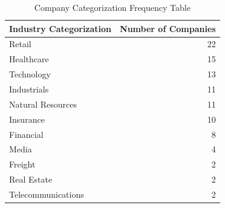 \documentclass[a4paper]{article}
\begin{document}
    \begin{table}[h]
        \begin{tabular}{| l | r |}
            \hline
            \textbf{Industry Categorization} & \textbf{Number of Companies}\\
            \hline
            Retail & 22 \\
            Healthcare & 15 \\
            Technology & 13 \\
            Industrials & 11 \\
            Natural Resources & 11 \\
            Insurance & 10 \\
            Financial & 8 \\
            Media & 4 \\
            Freight & 2 \\
            Real Estate & 2 \\
            Telecommunications & 2 \\
            \hline
        \end{tabular}
        \caption{Company Categorization Frequency Table}
    \end{table}
\end{document}
